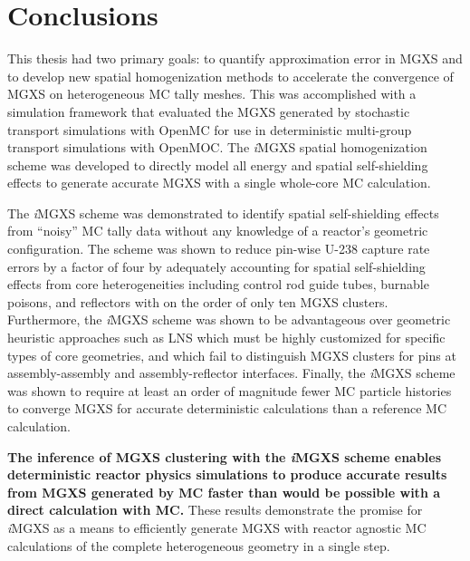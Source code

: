 \documentclass[12pt,twoside]{mitthesis-exec}
\begin{document}
\clearpage

\section*{Conclusions}

This thesis had two primary goals: to quantify approximation error in MGXS and to develop new spatial homogenization methods to accelerate the convergence of MGXS on heterogeneous MC tally meshes. This was accomplished with a simulation framework that evaluated the MGXS generated by stochastic transport simulations with OpenMC for use in deterministic multi-group transport simulations with OpenMOC. The \textit{i}MGXS spatial homogenization scheme was developed to directly model all energy and spatial self-shielding effects to generate accurate MGXS with a single whole-core MC calculation. 



The \textit{i}MGXS scheme was demonstrated to identify spatial self-shielding effects from ``noisy'' MC tally data without any knowledge of a reactor's geometric configuration. The scheme was shown to reduce pin-wise U-238 capture rate errors by a factor of four by adequately accounting for spatial self-shielding effects from core heterogeneities including control rod guide tubes, burnable poisons, and reflectors with on the order of only ten MGXS clusters. Furthermore, the \textit{i}MGXS scheme was shown to be advantageous over geometric heuristic approaches such as LNS which must be highly customized for specific types of core geometries, and which fail to distinguish MGXS clusters for pins at assembly-assembly and assembly-reflector interfaces. Finally, the \textit{i}MGXS scheme was shown to require at least an order of magnitude fewer MC particle histories to converge MGXS for accurate deterministic calculations than a reference MC calculation. 

\textbf{The inference of MGXS clustering with the \textit{i}MGXS scheme enables deterministic reactor physics simulations to produce accurate results from MGXS generated by MC faster than would be possible with a direct calculation with MC.} These results demonstrate the promise for \textit{i}MGXS as a means to efficiently generate MGXS with reactor agnostic MC calculations of the complete heterogeneous geometry in a single step.
\end{document}
